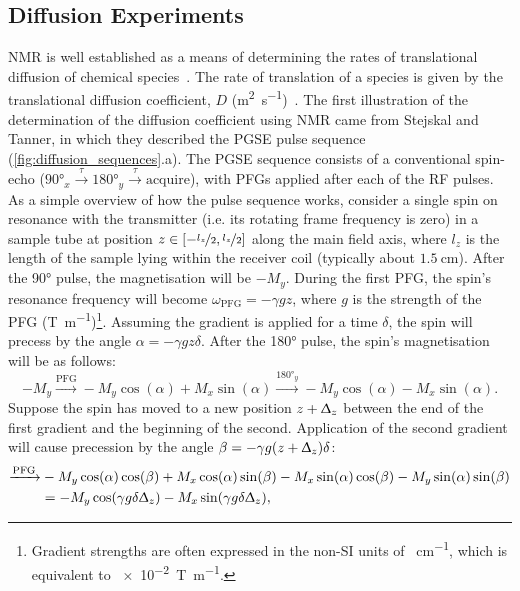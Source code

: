 \subsection{Diffusion Experiments}
\label{subsec:diffusion_experiments}
\ac{NMR} is well established as a means of determining the rates of
translational diffusion of chemical species~\cite{Johnson1999,Morris2009b}.
The rate of translation of a species is given by the translational
diffusion coefficient, $D$ (\unit{\meter\squared\per\second})~\cite[Chapter
19]{Atkins2014}.
The first illustration of the determination of the diffusion coefficient using
\ac{NMR} came from Stejskal and Tanner, in which they described the \ac{PGSE}
pulse sequence~\cite{Stejskal1965} (\cref{fig:diffusion_sequences}.a).
The \ac{PGSE} sequence consists of a conventional spin-echo ($\ang{90}_x
\xrightarrow{\tau} \ang{180}_y \xrightarrow{\tau} \text{acquire}$), with
\acp{PFG} applied after each of the \ac{RF} pulses.
As a simple overview of how the pulse sequence works, consider a single spin on
resonance with the transmitter (i.e. its rotating frame frequency is zero) in a
sample tube at position $z \in [-\nicefrac{l_z}{2}, \nicefrac{l_z}{2}]$ along
the main field axis, where $l_z$ is the length of the sample lying within the
receiver coil (typically about $\qty{1.5}{\centi\meter}$).
After the \ang{90} pulse, the magnetisation will be $-M_y$.
During the first \ac{PFG}, the spin's resonance frequency will become
$\omega_{\text{PFG}} = -\gamma g z$, where $g$ is the strength of the \ac{PFG}
(\unit{\tesla\per\meter})\footnote{
    Gradient strengths are often expressed in the non-\ac{SI} units of
    \unit{\gauss\per\centi\meter}, which is equivalent to
    \qty[print-unity-mantissa = false]{e-2}{\tesla\per\meter}.
}.
Assuming the gradient is applied for a time $\delta$, the spin will
precess by the angle $\alpha = -\gamma g z \delta$. After the \ang{180}
pulse, the spin's magnetisation will be as follows:
\[
    -M_y
    \xrightarrow{\text{PFG}} -M_y \cos(\alpha) + M_x \sin(\alpha)
    \xrightarrow{\ang{180}_y} -M_y \cos(\alpha) - M_x \sin(\alpha).
\]
Suppose the spin has moved to a new position $z + \Updelta_z$
between the end of the first gradient and the beginning of the second.
Application of the second gradient will cause precession by the angle
$\beta = -\gamma g (z + \Updelta_z) \delta$:
\begin{equation*}
   \begin{split}
        \xrightarrow{\text{PFG}}
            &-M_y \cos(\alpha)\cos(\beta) +
            M_x \cos(\alpha)\sin(\beta) -
            M_x \sin(\alpha)\cos(\beta) -
            M_y \sin(\alpha)\sin(\beta)\\
        &= -M_y \cos(\gamma g \delta \Updelta_z) -
           M_x \sin(\gamma g \delta \Updelta_z),
   \end{split}
\end{equation*}

